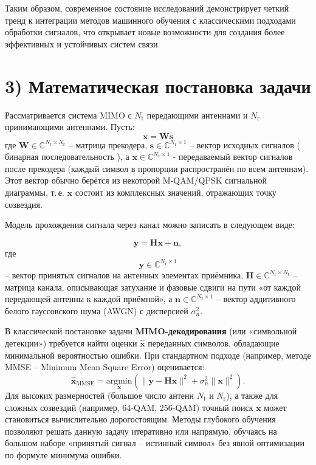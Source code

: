 \documentclass{article}
\begin{document}
Таким образом, современное состояние исследований демонстрирует четкий тренд к интеграции методов машинного обучения с классическими подходами обработки сигналов, что открывает новые возможности для создания более эффективных и устойчивых систем связи.

\section*{3) Математическая постановка задачи}
Рассматривается система MIMO с \( N_\text{t} \) передающими антеннами и \( N_\text{r} \) принимающими антеннами. Пусть:
\begin{equation}
\mathbf{x} = \mathbf{W} \mathbf{s}
\end{equation}
где \(\mathbf{W} \in \mathbb{C}^{N_\text{t} \times N_\text{r}}\) – матрица прекодера, \(\mathbf{s} \in \mathbb{C}^{N_\text{r} \times 1}\) – вектор исходных сигналов ( бинарная последовательность ), а \(\mathbf{x} \in \mathbb{C}^{N_\text{t} \times 1}\) - передаваемый вектор сигналов после прекодера (каждый символ в пропорции распространён по всем антеннам). Этот вектор обычно берётся из некоторой M-QAM/QPSK сигнальной диаграммы, т.\,е. \( \mathbf{x} \) состоит из комплексных значений, отражающих точку созвездия.

Модель прохождения сигнала через канал можно записать в следующем виде:

\begin{equation}
\mathbf{y} = \mathbf{H} \mathbf{x} + \mathbf{n},
\end{equation}
где
\[
\mathbf{y} \in \mathbb{C}^{N_\text{r} \times 1}
\]
– вектор принятых сигналов на антенных элементах приёмника, \(\mathbf{H} \in \mathbb{C}^{N_\text{r} \times N_\text{t}}\) – матрица канала, описывающая затухание и фазовые сдвиги на пути «от каждой передающей антенны к каждой приёмной», а \(\mathbf{n} \in \mathbb{C}^{N_\text{r} \times 1}\) – вектор аддитивного белого гауссовского шума (AWGN) с дисперсией \(\sigma_n^2\).

В классической постановке задачи \textbf{MIMO-декодирования} (или «символьной детекции») требуется найти оценки \(\hat{\mathbf{x}}\) переданных символов, обладающие минимальной вероятностью ошибки. При стандартном подходе (например, методе MMSE – Minimum Mean Square Error) оценивается:
\begin{equation}
\hat{\mathbf{x}}_\mathrm{MMSE} = \underset{\mathbf{x}}{\mathrm{argmin}}( 
\Big\lVert \mathbf{y} - \mathbf{H}\mathbf{x} \Big\rVert^2 + \sigma_n^2 \lVert \mathbf{x} \rVert^2).
\end{equation}
Для высоких размерностей (большое число антенн \(N_\text{t}\) и \(N_\text{r}\)), а также для сложных созвездий (например, 64-QAM, 256-QAM) точный поиск \(\mathbf{x}\) может становиться вычислительно дорогостоящим. Методы глубокого обучения позволяют решать данную задачу итеративно или напрямую, обучаясь на большом наборе «принятый сигнал – истинный символ» без явной оптимизации по формуле минимума ошибки.
\end{document}
